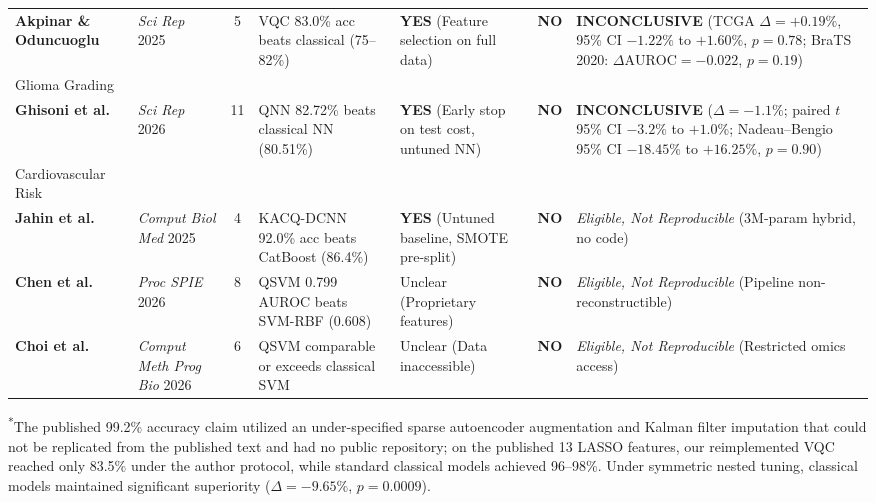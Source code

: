 \documentclass[10pt,a4paper,twoside]{article}
\begin{document}
\begin{table}[t]
{\begin{tabular}{p{3.2cm} p{2.2cm} c p{3.4cm} p{2.8cm} c p{3.6cm}}
\textbf{Akpinar \& Oduncuoglu} & \textit{Sci Rep} 2025 \cite{akpinar2025} & 5 & VQC 83.0\% acc beats classical (75--82\%) & \textbf{YES} (Feature selection on full data) & \textbf{NO} & \textbf{INCONCLUSIVE} (TCGA $\Delta = +0.19\%$, 95\% CI $-1.22\%$ to $+1.60\%$, $p = 0.78$; BraTS 2020: $\Delta\text{AUROC} = -0.022$, $p = 0.19$) \\
Glioma Grading & & & & & & \\
\addlinespace
\textbf{Ghisoni et al.} & \textit{Sci Rep} 2026 \cite{ghisoni2026} & 11 & QNN 82.72\% beats classical NN (80.51\%) & \textbf{YES} (Early stop on test cost, untuned NN) & \textbf{NO} & \textbf{INCONCLUSIVE} ($\Delta = -1.1\%$; paired $t$ 95\% CI $-3.2\%$ to $+1.0\%$; Nadeau--Bengio 95\% CI $-18.45\%$ to $+16.25\%$, $p = 0.90$) \\
Cardiovascular Risk & & & & & & \\
\addlinespace
\textbf{Jahin et al.} & \textit{Comput Biol Med} 2025 \cite{jahin2025} & 4 & KACQ-DCNN 92.0\% acc beats CatBoost (86.4\%) & \textbf{YES} (Untuned baseline, SMOTE pre-split) & \textbf{NO} & \textit{Eligible, Not Reproducible} (3M-param hybrid, no code) \\
\addlinespace
\textbf{Chen et al.} & \textit{Proc SPIE} 2026 \cite{chen2026} & 8 & QSVM 0.799 AUROC beats SVM-RBF (0.608) & Unclear (Proprietary features) & \textbf{NO} & \textit{Eligible, Not Reproducible} (Pipeline non-reconstructible) \\
\addlinespace
\textbf{Choi et al.} & \textit{Comput Meth Prog Bio} 2026 \cite{choi2026} & 6 & QSVM comparable or exceeds classical SVM & Unclear (Data inaccessible) & \textbf{NO} & \textit{Eligible, Not Reproducible} (Restricted omics access) \\
\bottomrule
\end{tabular}}%
\vspace{2pt}
\begin{flushleft}
\footnotesize\textsuperscript{*}The published 99.2\% accuracy claim utilized an under-specified sparse autoencoder augmentation and Kalman filter imputation that could not be replicated from the published text and had no public repository; on the published 13 LASSO features, our reimplemented VQC reached only 83.5\% under the author protocol, while standard classical models achieved 96--98\%. Under symmetric nested tuning, classical models maintained significant superiority ($\Delta = -9.65\%$, $p = 0.0009$).
\end{flushleft}
\vspace{4pt}
\end{table}
\end{document}
